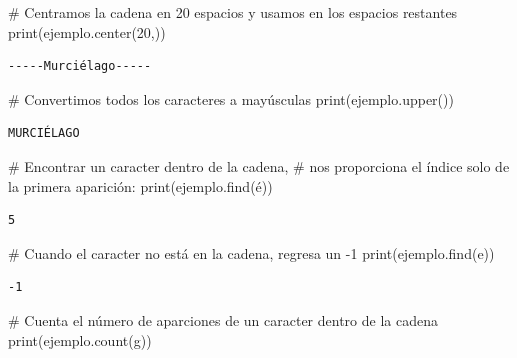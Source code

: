 \documentclass[
  spanish,
  letterpaper,
]{scrbook}
\newenvironment{Shaded}{\begin{snugshade}}{\end{snugshade}}
\newcommand{\BuiltInTok}[1]{\textcolor[rgb]{0.00,0.23,0.31}{#1}}
\newcommand{\CommentTok}[1]{\textcolor[rgb]{0.37,0.37,0.37}{#1}}
\newcommand{\DecValTok}[1]{\textcolor[rgb]{0.68,0.00,0.00}{#1}}
\newcommand{\NormalTok}[1]{\textcolor[rgb]{0.00,0.23,0.31}{#1}}
\newcommand{\StringTok}[1]{\textcolor[rgb]{0.13,0.47,0.30}{#1}}
\theoremstyle{definition}
\theoremstyle{remark}
\begin{document}
\begin{Shaded}
\begin{Highlighting}[]
\CommentTok{\# Centramos la cadena en 20 espacios y usamos \textquotesingle{}{-}\textquotesingle{} en los espacios restantes}
\BuiltInTok{print}\NormalTok{(ejemplo.center(}\DecValTok{20}\NormalTok{,}\StringTok{\textquotesingle{}{-}\textquotesingle{}}\NormalTok{)) }
\end{Highlighting}
\end{Shaded}

\begin{verbatim}
-----Murciélago-----
\end{verbatim}

\begin{Shaded}
\begin{Highlighting}[]
\CommentTok{\# Convertimos todos los caracteres a mayúsculas}
\BuiltInTok{print}\NormalTok{(ejemplo.upper())}
\end{Highlighting}
\end{Shaded}

\begin{verbatim}
MURCIÉLAGO
\end{verbatim}

\begin{Shaded}
\begin{Highlighting}[]
\CommentTok{\# Encontrar un caracter dentro de la cadena, }
\CommentTok{\# nos proporciona el índice solo de la primera aparición:}
\BuiltInTok{print}\NormalTok{(ejemplo.find(}\StringTok{\textquotesingle{}é\textquotesingle{}}\NormalTok{))}
\end{Highlighting}
\end{Shaded}

\begin{verbatim}
5
\end{verbatim}

\begin{Shaded}
\begin{Highlighting}[]
\CommentTok{\# Cuando el caracter no está en la cadena, regresa un {-}1}
\BuiltInTok{print}\NormalTok{(ejemplo.find(}\StringTok{\textquotesingle{}e\textquotesingle{}}\NormalTok{))}
\end{Highlighting}
\end{Shaded}

\begin{verbatim}
-1
\end{verbatim}

\begin{Shaded}
\begin{Highlighting}[]
\CommentTok{\# Cuenta el número de aparciones de un caracter dentro de la cadena}
\BuiltInTok{print}\NormalTok{(ejemplo.count(}\StringTok{\textquotesingle{}g\textquotesingle{}}\NormalTok{))}
\end{Highlighting}
\end{Shaded}
\end{document}
